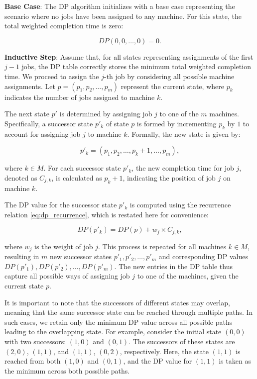 \textbf{Base Case}: The DP algorithm initializes with a base case representing the scenario where no jobs have been assigned to any machine. For this state, the total weighted completion time is zero:

\[
    DP(0, 0, \dots, 0) = 0.
\]

\textbf{Inductive Step}: Assume that, for all states representing assignments of the first $j-1$ jobs, the DP table correctly stores the minimum total weighted completion time. We proceed to assign the $j$-th job by considering all possible machine assignments. Let $p = (p_1, p_2, \dots, p_m)$ represent the current state, where $p_k$ indicates the number of jobs assigned to machine $k$.

The next state $p'$ is determined by assigning job $j$ to one of the $m$ machines. Specifically, a successor state $p'_k$ of state $p$ is formed by incrementing $p_k$ by $1$ to account for assigning job $j$ to machine $k$. Formally, the new state is given by:

\[
    p'_k = (p_1, p_2, \dots, p_k + 1, \dots, p_m),
\]

where $k \in M$. For each successor state $p'_k$, the new completion time for job $j$, denoted as $C_{j,k}$, is calculated as $p_k + 1$, indicating the position of job $j$ on machine $k$.

The DP value for the successor state $p'_k$ is computed using the recurrence relation \autoref{eq:dp_recurrence}, which is restated here for convenience:

\[
    DP(p'_k) = DP(p) + w_j \times C_{j,k},
\]

where $w_j$ is the weight of job $j$. This process is repeated for all machines $k \in M$, resulting in $m$ new successor states $p'_1, p'_2, \dots, p'_m$ and corresponding DP values $DP(p'_1), DP(p'_2), \dots, DP(p'_m)$. The new entries in the DP table thus capture all possible ways of assigning job $j$ to one of the machines, given the current state $p$.

It is important to note that the successors of different states may overlap, meaning that the same successor state can be reached through multiple paths. In such cases, we retain only the minimum DP value across all possible paths leading to the overlapping state. For example, consider the initial state $(0, 0)$ with two successors: $(1, 0)$ and $(0, 1)$. The successors of these states are $(2, 0)$, $(1, 1)$, and $(1, 1)$, $(0, 2)$, respectively. Here, the state $(1, 1)$ is reached from both $(1, 0)$ and $(0, 1)$, and the DP value for $(1, 1)$ is taken as the minimum across both possible paths.

